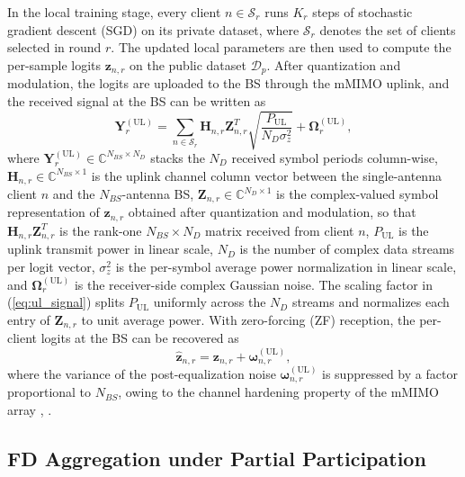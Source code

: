 \documentclass[journal]{IEEEtran}
\begin{document}
In the local training stage, every client $n \in \mathcal{S}_r$ runs $K_r$ steps of stochastic gradient descent (SGD) on its private dataset, where $\mathcal{S}_r$ denotes the set of clients selected in round $r$. The updated local parameters are then used to compute the per-sample logits $\bm{z}_{n,r}$ on the public dataset $\mathcal{D}_p$. After quantization and modulation, the logits are uploaded to the BS through the mMIMO uplink, and the received signal at the BS can be written as
\begin{equation}
\bm{Y}^{(\text{UL})}_{r} = \sum_{n \in \mathcal{S}_r} \bm{H}_{n,r} \bm{Z}_{n,r}^{T} \sqrt{\frac{P_{\text{UL}}}{N_D \sigma_z^2}} + \bm{\Omega}^{(\text{UL})}_{r},
\label{eq:ul_signal}
\end{equation}
where $\bm{Y}^{(\text{UL})}_{r} \in \mathbb{C}^{N_{BS} \times N_D}$ stacks the $N_D$ received symbol periods column-wise, $\bm{H}_{n,r} \in \mathbb{C}^{N_{BS} \times 1}$ is the uplink channel column vector between the single-antenna client $n$ and the $N_{BS}$-antenna BS, $\bm{Z}_{n,r} \in \mathbb{C}^{N_D \times 1}$ is the complex-valued symbol representation of $\bm{z}_{n,r}$ obtained after quantization and modulation, so that $\bm{H}_{n,r}\bm{Z}_{n,r}^{T}$ is the rank-one $N_{BS}\times N_D$ matrix received from client $n$, $P_{\text{UL}}$ is the uplink transmit power in linear scale, $N_D$ is the number of complex data streams per logit vector, $\sigma_z^2$ is the per-symbol average power normalization in linear scale, and $\bm{\Omega}^{(\text{UL})}_{r}$ is the receiver-side complex Gaussian noise. The scaling factor in (\ref{eq:ul_signal}) splits $P_{\text{UL}}$ uniformly across the $N_D$ streams and normalizes each entry of $\bm{Z}_{n,r}$ to unit average power. With zero-forcing (ZF) reception, the per-client logits at the BS can be recovered as
\begin{equation}
\hat{\bm{z}}_{n,r} = \bm{z}_{n,r} + \bm{\omega}^{(\text{UL})}_{n,r},
\label{eq:ul_zf}
\end{equation}
where the variance of the post-equalization noise $\bm{\omega}^{(\text{UL})}_{n,r}$ is suppressed by a factor proportional to $N_{BS}$, owing to the channel hardening property of the mMIMO array \cite{mu2024fedtskd}, \cite{vu2020cell}.

\subsection{FD Aggregation under Partial Participation}
\label{ssec:fd-aggregation}
\end{document}
